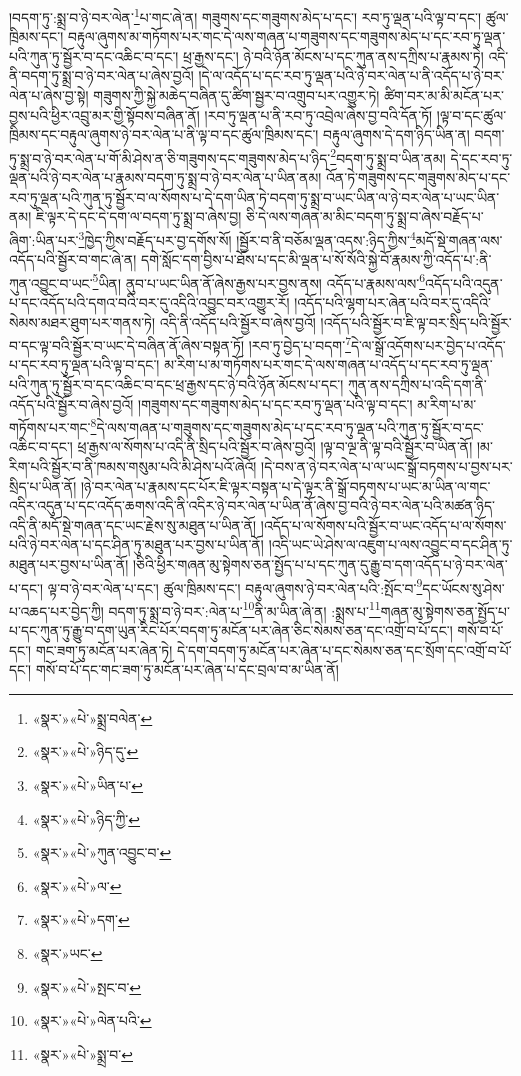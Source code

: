 །བདག་ཏུ་:སྨྲ་བ་ཉེ་བར་ལེན་\footnote{«སྣར་»«པེ་»སྨྲ་བལེན་}པ་གང་ཞེ་ན། གཟུགས་དང་གཟུགས་མེད་པ་དང་། རབ་ཏུ་ལྡན་པའི་ལྟ་བ་དང་། ཚུལ་ཁྲིམས་དང་། བརྟུལ་ཞུགས་མ་གཏོགས་པར་གང་དེ་ལས་གཞན་པ་གཟུགས་དང་གཟུགས་མེད་པ་དང་རབ་ཏུ་ལྡན་པའི་ཀུན་ཏུ་སྦྱོར་བ་དང་འཆིང་བ་དང་། ཕྲ་རྒྱས་དང་། ཉེ་བའི་ཉོན་མོངས་པ་དང་ཀུན་ནས་དཀྲིས་པ་རྣམས་ཏེ། འདི་ནི་བདག་ཏུ་སྨྲ་བ་ཉེ་བར་ལེན་པ་ཞེས་བྱའོ། །དེ་ལ་འདོད་པ་དང་རབ་ཏུ་ལྡན་པའི་ཉེ་བར་ལེན་པ་ནི་འདོད་པ་ཉེ་བར་ལེན་པ་ཞེས་བྱ་སྟེ། གཟུགས་ཀྱི་སྐྱེ་མཆེད་བཞིན་དུ་ཚིག་སྦྱར་བ་འགྲུབ་པར་འགྱུར་ཏེ། ཚིག་བར་མ་མི་མངོན་པར་བྱས་པའི་ཕྱིར་འབྲུ་མར་གྱི་སྟོབས་བཞིན་ནོ། །རབ་ཏུ་ལྡན་པ་ནི་རབ་ཏུ་འབྲེལ་ཞེས་བྱ་བའི་དོན་ཏོ། །ལྟ་བ་དང་ཚུལ་ཁྲིམས་དང་བརྟུལ་ཞུགས་ཉེ་བར་ལེན་པ་ནི་ལྟ་བ་དང་ཚུལ་ཁྲིམས་དང་། བརྟུལ་ཞུགས་དེ་དག་ཉིད་ཡིན་ན། བདག་ཏུ་སྨྲ་བ་ཉེ་བར་ལེན་པ་གོ་མི་ཤེས་ན་ཅི་གཟུགས་དང་གཟུགས་མེད་པ་ཉིད་\footnote{«སྣར་»«པེ་»ཉིད་དུ་}བདག་ཏུ་སྨྲ་བ་ཡིན་ནམ། དེ་དང་རབ་ཏུ་ལྡན་པའི་ཉེ་བར་ལེན་པ་རྣམས་བདག་ཏུ་སྨྲ་བ་ཉེ་བར་ལེན་པ་ཡིན་ནམ། འོན་ཏེ་གཟུགས་དང་གཟུགས་མེད་པ་དང་རབ་ཏུ་ལྡན་པའི་ཀུན་ཏུ་སྦྱོར་བ་ལ་སོགས་པ་དེ་དག་ཡིན་ཏེ་བདག་ཏུ་སྨྲ་བ་ཡང་ཡིན་ལ་ཉེ་བར་ལེན་པ་ཡང་ཡིན་ནམ། ཇི་ལྟར་དེ་དང་དེ་དག་ལ་བདག་ཏུ་སྨྲ་བ་ཞེས་བྱ། ཅི་དེ་ལས་གཞན་མ་མིང་བདག་ཏུ་སྨྲ་བ་ཞེས་བརྗོད་པ་ཞིག་:ཡིན་པར་\footnote{«སྣར་»«པེ་»ཡིན་པ་}ཁྱེད་ཀྱིས་བརྗོད་པར་བྱ་དགོས་སོ། །སྦྱོར་བ་ནི་བཅོམ་ལྡན་འདས་:ཉིད་ཀྱིས་\footnote{«སྣར་»«པེ་»ཉིད་ཀྱི་}མདོ་སྡེ་གཞན་ལས་འདོད་པའི་སྦྱོར་བ་གང་ཞེ་ན། དགེ་སློང་དག་བྱིས་པ་ཐོས་པ་དང་མི་ལྡན་པ་སོ་སོའི་སྐྱེ་བོ་རྣམས་ཀྱི་འདོད་པ་:ནི་ཀུན་འབྱུང་བ་ཡང་\footnote{«སྣར་»«པེ་»ཀུན་འབྱུང་བ་}ཡིན། ནུབ་པ་ཡང་ཡིན་ནོ་ཞེས་རྒྱས་པར་བྱས་ནས། འདོད་པ་རྣམས་ལས་\footnote{«སྣར་»«པེ་»ལ་}འདོད་པའི་འདུན་པ་དང་འདོད་པའི་དགའ་བའི་བར་དུ་འདིའི་འབྱུང་བར་འགྱུར་རོ། །འདོད་པའི་ལྷག་པར་ཞེན་པའི་བར་དུ་འདིའི་སེམས་མཐར་ཐུག་པར་གནས་ཏེ། འདི་ནི་འདོད་པའི་སྦྱོར་བ་ཞེས་བྱའོ། །འདོད་པའི་སྦྱོར་བ་ཇི་ལྟ་བར་སྲིད་པའི་སྦྱོར་བ་དང་ལྟ་བའི་སྦྱོར་བ་ཡང་དེ་བཞིན་ནོ་ཞེས་བསྟན་ཏོ། །རབ་ཏུ་བྱེད་པ་བདག་\footnote{«སྣར་»«པེ་»དག་}དེ་ལ་སྒྲོ་འདོགས་པར་བྱེད་པ་འདོད་པ་དང་རབ་ཏུ་ལྡན་པའི་ལྟ་བ་དང་། མ་རིག་པ་མ་གཏོགས་པར་གང་དེ་ལས་གཞན་པ་འདོད་པ་དང་རབ་ཏུ་ལྡན་པའི་ཀུན་ཏུ་སྦྱོར་བ་དང་འཆིང་བ་དང་ཕྲ་རྒྱས་དང་ཉེ་བའི་ཉོན་མོངས་པ་དང་། ཀུན་ནས་དཀྲིས་པ་འདི་དག་ནི་འདོད་པའི་སྦྱོར་བ་ཞེས་བྱའོ། །གཟུགས་དང་གཟུགས་མེད་པ་དང་རབ་ཏུ་ལྡན་པའི་ལྟ་བ་དང་། མ་རིག་པ་མ་གཏོགས་པར་གང་\footnote{«སྣར་»ཡང་}དེ་ལས་གཞན་པ་གཟུགས་དང་གཟུགས་མེད་པ་དང་རབ་ཏུ་ལྡན་པའི་ཀུན་ཏུ་སྦྱོར་བ་དང་འཆིང་བ་དང་། ཕྲ་རྒྱས་ལ་སོགས་པ་འདི་ནི་སྲིད་པའི་སྦྱོར་བ་ཞེས་བྱའོ། །ལྟ་བ་ལྔ་ནི་ལྟ་བའི་སྦྱོར་བ་ཡིན་ནོ། །མ་རིག་པའི་སྦྱོར་བ་ནི་ཁམས་གསུམ་པའི་མི་ཤེས་པའོ་ཞེའོ། །དེ་བས་ན་ཉེ་བར་ལེན་པ་ལ་ཡང་སྒྲོ་བཏགས་པ་བྱས་པར་སྲིད་པ་ཡིན་ནོ། །ཉེ་བར་ལེན་པ་རྣམས་དང་པོར་ཇི་ལྟར་བསྟན་པ་དེ་ལྟར་ནི་སྒྲོ་བཏགས་པ་ཡང་མ་ཡིན་ལ་གང་འདིར་འདུན་པ་དང་འདོད་ཆགས་འདི་ནི་འདིར་ཉེ་བར་ལེན་པ་ཡིན་ནོ་ཞེས་བྱ་བའི་ཉེ་བར་ལེན་པའི་མཚན་ཉིད་འདི་ནི་མདོ་སྡེ་གཞན་དང་ཡང་རྗེས་སུ་མཐུན་པ་ཡིན་ནོ། །འདོད་པ་ལ་སོགས་པའི་སྦྱོར་བ་ཡང་འདོད་པ་ལ་སོགས་པའི་ཉེ་བར་ལེན་པ་དང་ཤིན་ཏུ་མཐུན་པར་བྱས་པ་ཡིན་ནོ། །འདི་ཡང་ཡེ་ཤེས་ལ་འཇུག་པ་ལས་འབྱུང་བ་དང་ཤིན་ཏུ་མཐུན་པར་བྱས་པ་ཡིན་ནོ། །ཅིའི་ཕྱིར་གཞན་མུ་སྟེགས་ཅན་སྤྱོད་པ་པ་དང་ཀུན་དུ་རྒྱུ་བ་དག་འདོད་པ་ཉེ་བར་ལེན་པ་དང་། ལྟ་བ་ཉེ་བར་ལེན་པ་དང་། ཚུལ་ཁྲིམས་དང་། བརྟུལ་ཞུགས་ཉེ་བར་ལེན་པའི་:སྤོང་བ་\footnote{«སྣར་»«པེ་»སྤང་བ་}དང་ཡོངས་སུ་ཤེས་པ་འཆད་པར་བྱེད་ཀྱི། བདག་ཏུ་སྨྲ་བ་ཉེ་བར་:ལེན་པ་\footnote{«སྣར་»«པེ་»ལེན་པའི་}ནི་མ་ཡིན་ཞེ་ན། :སྨྲས་པ་\footnote{«སྣར་»«པེ་»སྨྲ་བ་}གཞན་མུ་སྟེགས་ཅན་སྤྱོད་པ་པ་དང་ཀུན་ཏུ་རྒྱུ་བ་དག་ཡུན་རིང་པོར་བདག་ཏུ་མངོན་པར་ཞེན་ཅིང་སེམས་ཅན་དང་འགྲོ་བ་པོ་དང་། གསོ་བ་པོ་དང་། གང་ཟག་ཏུ་མངོན་པར་ཞེན་ཏེ། དེ་དག་བདག་ཏུ་མངོན་པར་ཞེན་པ་དང་སེམས་ཅན་དང་སྲོག་དང་འགྲོ་བ་པོ་དང་། གསོ་བ་པོ་དང་གང་ཟག་ཏུ་མངོན་པར་ཞེན་པ་དང་བྲལ་བ་མ་ཡིན་ནོ། 